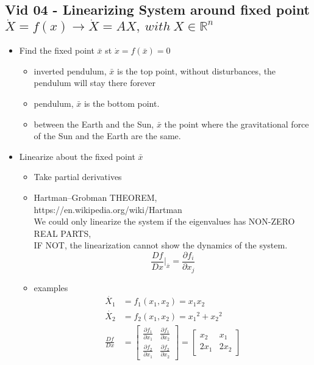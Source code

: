 \subsection{Vid 04 - Linearizing System around fixed point\\ $\dot{X} = f(x) \rightarrow \dot{X} = AX, ~with~ X\in\mathbb{R}^{n}$}
\begin{itemize}
  \item Find the fixed point $\bar{x}$ st $\dot{x} = f(\bar{x}) = 0$
    \begin{itemize}
      \item inverted pendulum, $\bar{x}$ is the top point, 
            without disturbances, the pendulum will stay there forever
      \item pendulum, $\bar{x}$ is the bottom point.
      \item between the Earth and the Sun, $\bar{x}$ 
            the point where the gravitational force of the Sun and the Earth are the same.
    \end{itemize}
   \item Linearize about the fixed point $\bar{x}$ 
    \begin{itemize}
      \item Take partial derivatives
      \item Hartman–Grobman THEOREM, 
            \\https://en.wikipedia.org/wiki/Hartman%
            \\We could only linearize the system if the eigenvalues has NON-ZERO REAL PARTS,
            \\IF NOT, the linearization cannot show the dynamics of the system.     
        \begin{equation}
          \frac{Df}{Dx}|_{\bar{x}} = \frac{\partial f_{i}}{\partial x_{j}}
        \end{equation}
      \item examples
        \begin{equation}
          \begin{aligned}
            \dot{X_{1}} &= f_{1}(x_{1}, x_{2}) = x_{1}x_{2} \\
            \dot{X_{2}} &= f_{2}(x_{1}, x_{2}) = {x_{1}}^2 + {x_{2}}^2 \\
            \frac{Df}{Dx} & =
            \begin{bmatrix}
              \frac{\partial f_{1}}{\partial x_{1}}  & \frac{\partial f_{1}}{\partial x_{2}} \\ 
              \frac{\partial f_{2}}{\partial x_{1}}  & \frac{\partial f_{2}}{\partial x_{2}} 
            \end{bmatrix}
            =
            \begin{bmatrix}
               x_{2} &  x_{1} \\ 
              2x_{1} & 2x_{2} 
            \end{bmatrix}
          \end{aligned}
        \end{equation}
    \end{itemize}
\end{itemize}
